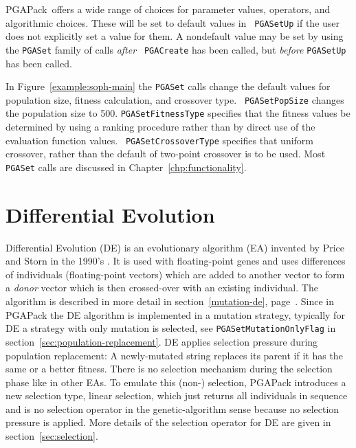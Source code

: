 \documentclass{report}
\newcommand{\pga}{PGAPack}
\begin{document}
\pga\ offers a wide range of choices for parameter values, operators,
and algorithmic choices.  These will be set to default values in {\tt
PGASetUp} if the user does not explicitly set a value for them.  A nondefault
value may be set by using the {\tt PGASet} family of calls {\em after} {\tt
PGACreate} has been called, but {\em before} {\tt PGASetUp} has been called.

In Figure~\ref{example:soph-main} the {\tt PGASet} calls change the default
values for population size, fitness calculation, and crossover type.  {\tt
PGASetPopSize} changes the population size to 500.  {\tt PGASetFitnessType}
specifies that the fitness values be determined by using a ranking procedure
rather than by direct use of the evaluation function values.  {\tt
PGASetCrossoverType} specifies that uniform crossover, rather than the default
of two-point crossover is to be used.  Most {\tt PGASet} calls are discussed
in Chapter~\ref{chp:functionality}.

\section{Differential Evolution}\label{sec:differential-evolution}

Differential Evolution (DE) is an evolutionary algorithm (EA) invented by
Price and Storn in the 1990's \cite{SP95,SP97,PSL05}. It is used with
floating-point genes and uses differences of individuals (floating-point
vectors) which are added to another vector to form a \textit{donor}
vector which is then crossed-over with an existing individual.
The algorithm is described in more detail in section~\ref{mutation-de},
page~\pageref{mutation-de}. Since in \pga{} the DE algorithm is
implemented in a mutation strategy, typically for DE a strategy with
only mutation is selected, see \verb+PGASetMutationOnlyFlag+ in
section~\ref{sec:population-replacement}. DE applies
selection pressure during population replacement: A newly-mutated string
replaces its parent if it has the same or a better fitness. There is no
selection mechanism during the selection phase like in other EAs. To
emulate this (non-) selection, \pga{} introduces a new selection type, linear
selection, which just returns all individuals in sequence and is no
selection operator in the genetic-algorithm sense because no selection
pressure is applied. More details of the selection operator for DE are
given in section~\ref{sec:selection}.
\end{document}
